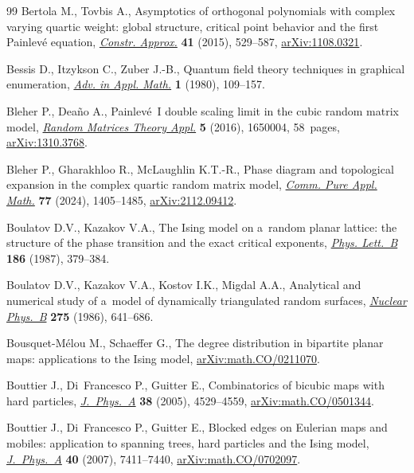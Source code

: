 \begin{thebibliography}{99}
Bertola M., Tovbis A., Asymptotics of orthogonal polynomials with complex
 varying quartic weight: global structure, critical point behavior and the
 first {P}ainlev\'e equation,
 \href{https://doi.org/10.1007/s00365-015-9288-0}{\textit{Constr. Approx.}}
 \textbf{41} (2015), 529--587,
 \href{http://arxiv.org/abs/1108.0321}{arXiv:1108.0321}.

Bessis D., Itzykson C., Zuber J.-B., Quantum field theory techniques in
 graphical enumeration,
 \href{https://doi.org/10.1016/0196-8858(80)90008-1}{\textit{Adv. in Appl.
 Math.}} \textbf{1} (1980), 109--157.

Bleher P., Dea\~no A., Painlev\'e~{I} double scaling limit in the cubic random
 matrix model, \href{https://doi.org/10.1142/S2010326316500040}{\textit{Random
 Matrices Theory Appl.}} \textbf{5} (2016), 1650004, 58~pages,
 \href{http://arxiv.org/abs/1310.3768}{arXiv:1310.3768}.

Bleher P., Gharakhloo R., McLaughlin K.T.-R., Phase diagram and topological
 expansion in the complex quartic random matrix model,
 \href{https://doi.org/10.1002/cpa.22164}{\textit{Comm. Pure Appl. Math.}}
 \textbf{77} (2024), 1405--1485,
 \href{http://arxiv.org/abs/2112.09412}{arXiv:2112.09412}.

Boulatov D.V., Kazakov V.A., The {I}sing model on a~random planar lattice: the
 structure of the phase transition and the exact critical exponents,
 \href{https://doi.org/10.1016/0370-2693(87)90312-1}{\textit{Phys. Lett.~B}}
 \textbf{186} (1987), 379--384.

Boulatov D.V., Kazakov V.A., Kostov I.K., Migdal A.A., Analytical and numerical
 study of a~model of dynamically triangulated random surfaces,
 \href{https://doi.org/10.1016/0550-3213(86)90578-X}{\textit{Nuclear Phys.~B}}
 \textbf{275} (1986), 641--686.

Bousquet-M\'elou M., Schaeffer G., The degree distribution in bipartite planar
 maps: applications to the {I}sing model,
 \href{http://arxiv.org/abs/math.CO/0211070}{arXiv:math.CO/0211070}.

Bouttier J., Di~Francesco P., Guitter E., Combinatorics of bicubic maps with
 hard particles,
 \href{https://doi.org/10.1088/0305-4470/38/21/002}{\textit{J.~Phys.~A}}
 \textbf{38} (2005), 4529--4559,
 \href{http://arxiv.org/abs/math.CO/0501344}{arXiv:math.CO/0501344}.

Bouttier J., Di~Francesco P., Guitter E., Blocked edges on {E}ulerian maps and
 mobiles: application to spanning trees, hard particles and the {I}sing model,
 \href{https://doi.org/10.1088/1751-8113/40/27/002}{\textit{J.~Phys.~A}}
 \textbf{40} (2007), 7411--7440,
 \href{http://arxiv.org/abs/math.CO/0702097}{arXiv:math.CO/0702097}.


\end{thebibliography}
